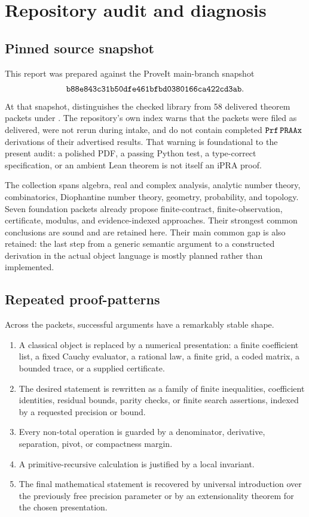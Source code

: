 \section{Repository audit and diagnosis}

\subsection{Pinned source snapshot}

This report was prepared against the ProveIt main-branch snapshot
\[
\texttt{b88e843c31b50dfe461bfbd0380166ca422cd3ab}.
\]
At that snapshot, 
distinguishes the checked  library from 58 delivered theorem
packets under .  The repository's own index warns that the
packets were filed as delivered, were not rerun during intake, and do not
contain completed \(\texttt{Prf}\,\texttt{PRAAx}\) derivations of their advertised results.
That warning is foundational to the present audit: a polished PDF, a passing
Python test, a type-correct specification, or an ambient Lean theorem is not
itself an iPRA proof.

The collection spans algebra, real and complex analysis, analytic number
theory, combinatorics, Diophantine number theory, geometry, probability, and
topology.  Seven foundation packets already propose finite-contract,
finite-observation, certificate, modulus, and evidence-indexed approaches.
Their strongest common conclusions are sound and are retained here.  Their
main common gap is also retained: the last step from a generic semantic
argument to a constructed derivation in the actual  object
language is mostly planned rather than implemented.

\subsection{Repeated proof-patterns}

Across the packets, successful arguments have a remarkably stable shape.

\begin{enumerate}
\item A classical object is replaced by a numerical presentation: a finite
      coefficient list, a fixed Cauchy evaluator, a rational law, a finite
      grid, a coded matrix, a bounded trace, or a supplied certificate.
\item The desired statement is rewritten as a family of finite inequalities,
      coefficient identities, residual bounds, parity checks, or finite
      search assertions, indexed by a requested precision or bound.
\item Every non-total operation is guarded by a denominator, derivative,
      separation, pivot, or compactness margin.
\item A primitive-recursive calculation is justified by a local invariant.
\item The final mathematical statement is recovered by universal introduction
      over the previously free precision parameter or by an extensionality
      theorem for the chosen presentation.
\end{enumerate}

